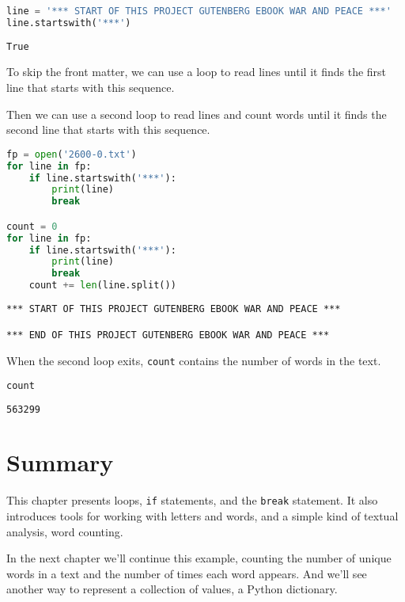 \begin{lstlisting}[language=Python,style=source]
line = '*** START OF THIS PROJECT GUTENBERG EBOOK WAR AND PEACE ***'
line.startswith('***')
\end{lstlisting}

\begin{lstlisting}[style=output]
True
\end{lstlisting}

To skip the front matter, we can use a loop to read lines until it finds
the first line that starts with this sequence.

\pagebreak

Then we can use a second loop to read lines and count words until it
finds the second line that starts with this sequence.

\begin{lstlisting}[language=Python,style=source]
fp = open('2600-0.txt')
for line in fp:
    if line.startswith('***'):
        print(line)
        break

count = 0
for line in fp:
    if line.startswith('***'):
        print(line)
        break
    count += len(line.split())
\end{lstlisting}

\begin{lstlisting}[style=output]
*** START OF THIS PROJECT GUTENBERG EBOOK WAR AND PEACE ***

*** END OF THIS PROJECT GUTENBERG EBOOK WAR AND PEACE ***

\end{lstlisting}

When the second loop exits, \passthrough{\lstinline!count!} contains the
number of words in the text.

\begin{lstlisting}[language=Python,style=source]
count
\end{lstlisting}

\begin{lstlisting}[style=output]
563299
\end{lstlisting}

\section{Summary}\label{summary}

This chapter presents loops, \passthrough{\lstinline!if!} statements,
and the \passthrough{\lstinline!break!} statement. It also introduces
tools for working with letters and words, and a simple kind of textual
analysis, word counting.

In the next chapter we'll continue this example, counting the number of
unique words in a text and the number of times each word appears. And
we'll see another way to represent a collection of values, a Python
dictionary.
